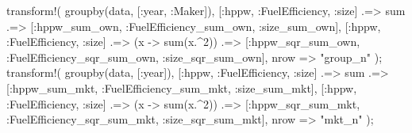 \documentclass[
  letterpaper,
  DIV=11,
  numbers=noendperiod]{scrreprt}
\newenvironment{Shaded}{\begin{snugshade}}{\end{snugshade}}
\newcommand{\FloatTok}[1]{\textcolor[rgb]{0.68,0.00,0.00}{#1}}
\newcommand{\FunctionTok}[1]{\textcolor[rgb]{0.28,0.35,0.67}{#1}}
\newcommand{\NormalTok}[1]{\textcolor[rgb]{0.00,0.23,0.31}{#1}}
\newcommand{\OperatorTok}[1]{\textcolor[rgb]{0.37,0.37,0.37}{#1}}
\newcommand{\StringTok}[1]{\textcolor[rgb]{0.13,0.47,0.30}{#1}}
\begin{document}
\begin{Shaded}
\begin{Highlighting}[]
\FunctionTok{transform!}\NormalTok{(}
    \FunctionTok{groupby}\NormalTok{(data, [}\OperatorTok{:}\NormalTok{year, }\OperatorTok{:}\NormalTok{Maker]),}
\NormalTok{    [}\OperatorTok{:}\NormalTok{hppw, }\OperatorTok{:}\NormalTok{FuelEfficiency, }\OperatorTok{:}\NormalTok{size] }\OperatorTok{.=\textgreater{}}\NormalTok{ sum }\OperatorTok{.=\textgreater{}}\NormalTok{ [}\OperatorTok{:}\NormalTok{hppw\_sum\_own, }\OperatorTok{:}\NormalTok{FuelEfficiency\_sum\_own, }\OperatorTok{:}\NormalTok{size\_sum\_own],}
\NormalTok{    [}\OperatorTok{:}\NormalTok{hppw, }\OperatorTok{:}\NormalTok{FuelEfficiency, }\OperatorTok{:}\NormalTok{size] }\OperatorTok{.=\textgreater{}}\NormalTok{ (x }\OperatorTok{{-}\textgreater{}} \FunctionTok{sum}\NormalTok{(x}\OperatorTok{.\^{}}\FloatTok{2}\NormalTok{)) }\OperatorTok{.=\textgreater{}}\NormalTok{ [}\OperatorTok{:}\NormalTok{hppw\_sqr\_sum\_own, }\OperatorTok{:}\NormalTok{FuelEfficiency\_sqr\_sum\_own, }\OperatorTok{:}\NormalTok{size\_sqr\_sum\_own],}
\NormalTok{    nrow }\OperatorTok{=\textgreater{}} \StringTok{"group\_n"}
\NormalTok{);}
\FunctionTok{transform!}\NormalTok{(}
    \FunctionTok{groupby}\NormalTok{(data, [}\OperatorTok{:}\NormalTok{year]),}
\NormalTok{    [}\OperatorTok{:}\NormalTok{hppw, }\OperatorTok{:}\NormalTok{FuelEfficiency, }\OperatorTok{:}\NormalTok{size] }\OperatorTok{.=\textgreater{}}\NormalTok{ sum }\OperatorTok{.=\textgreater{}}\NormalTok{ [}\OperatorTok{:}\NormalTok{hppw\_sum\_mkt, }\OperatorTok{:}\NormalTok{FuelEfficiency\_sum\_mkt, }\OperatorTok{:}\NormalTok{size\_sum\_mkt],}
\NormalTok{    [}\OperatorTok{:}\NormalTok{hppw, }\OperatorTok{:}\NormalTok{FuelEfficiency, }\OperatorTok{:}\NormalTok{size] }\OperatorTok{.=\textgreater{}}\NormalTok{ (x }\OperatorTok{{-}\textgreater{}} \FunctionTok{sum}\NormalTok{(x}\OperatorTok{.\^{}}\FloatTok{2}\NormalTok{)) }\OperatorTok{.=\textgreater{}}\NormalTok{ [}\OperatorTok{:}\NormalTok{hppw\_sqr\_sum\_mkt, }\OperatorTok{:}\NormalTok{FuelEfficiency\_sqr\_sum\_mkt, }\OperatorTok{:}\NormalTok{size\_sqr\_sum\_mkt],}
\NormalTok{    nrow }\OperatorTok{=\textgreater{}} \StringTok{"mkt\_n"}
\NormalTok{);}
\end{Highlighting}
\end{Shaded}
\end{document}
